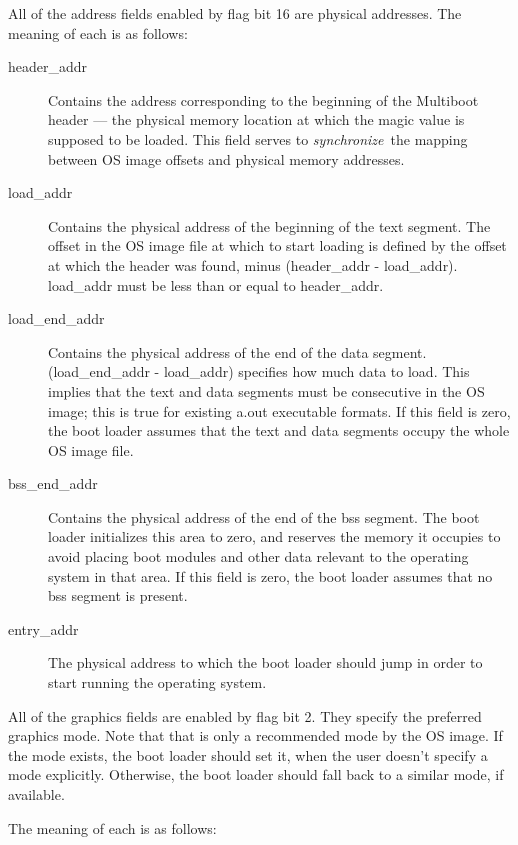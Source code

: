 \label{mbaddr}

All of the address fields enabled by flag bit 16 are physical addresses. The meaning of each is as follows:

\begin{description}
\item[header\_addr]
Contains the address corresponding to the beginning of the Multiboot header —
the physical memory location at which the magic value is supposed to be loaded.
This field serves to \emph{synchronize}\ the mapping between OS image offsets
and physical memory addresses.
\item[load\_addr]
Contains the physical address of the beginning of the text segment. The offset
in the OS image file at which to start loading is defined by the offset at which
the header was found, minus (header\_addr - load\_addr). load\_addr must be less
than or equal to header\_addr.
\item[load\_end\_addr]
Contains the physical address of the end of the data segment. (load\_end\_addr -
load\_addr) specifies how much data to load. This implies that the text and data
segments must be consecutive in the OS image; this is true for existing a.out
executable formats. If this field is zero, the boot loader assumes that the text
and data segments occupy the whole OS image file.
\item[bss\_end\_addr]
Contains the physical address of the end of the bss segment. The boot loader
initializes this area to zero, and reserves the memory it occupies to avoid
placing boot modules and other data relevant to the operating system in that
area. If this field is zero, the boot loader assumes that no bss segment is
present.
\item[entry\_addr]
The physical address to which the boot loader should jump in order to start
running the operating system.
\end{description}

\label{mbgraph}

All of the graphics fields are enabled by flag bit 2. They specify the preferred
graphics mode. Note that that is only a recommended mode by the OS image. If the
mode exists, the boot loader should set it, when the user doesn't specify a mode
explicitly. Otherwise, the boot loader should fall back to a similar mode, if
available.

The meaning of each is as follows:

